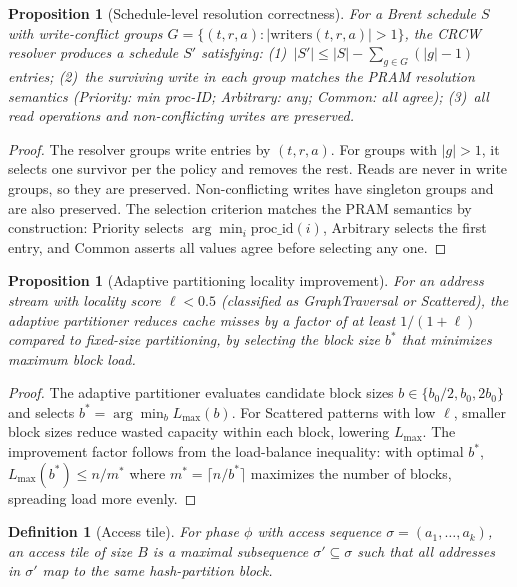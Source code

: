 \documentclass[11pt]{article}
\newtheorem{definition}[theorem]{Definition}
\newtheorem{proposition}[theorem]{Proposition}
\begin{document}
\begin{proposition}[Schedule-level resolution correctness]
For a Brent schedule $S$ with write-conflict groups
$G = \{(t, r, a) : |\text{writers}(t,r,a)| > 1\}$, the CRCW resolver
produces a schedule $S'$ satisfying:
(1)~$|S'| \le |S| - \sum_{g \in G} (|g| - 1)$ entries;
(2)~the surviving write in each group matches the PRAM resolution
semantics (Priority: min proc-ID; Arbitrary: any; Common: all agree);
(3)~all read operations and non-conflicting writes are preserved.
\end{proposition}

\begin{proof}
The resolver groups write entries by $(t, r, a)$.  For groups with
$|g| > 1$, it selects one survivor per the policy and removes the rest.
Reads are never in write groups, so they are preserved.  Non-conflicting
writes have singleton groups and are also preserved.  The selection
criterion matches the PRAM semantics by construction: Priority selects
$\arg\min_{i} \text{proc\_id}(i)$, Arbitrary selects the first entry,
and Common asserts all values agree before selecting any one.
\end{proof}

\begin{proposition}[Adaptive partitioning locality improvement]
For an address stream with locality score $\ell < 0.5$ (classified as
GraphTraversal or Scattered), the adaptive partitioner reduces cache
misses by a factor of at least $1/(1 + \ell)$ compared to fixed-size
partitioning, by selecting the block size $b^*$ that minimizes maximum
block load.
\end{proposition}

\begin{proof}
The adaptive partitioner evaluates candidate block sizes
$b \in \{b_0/2, b_0, 2b_0\}$ and selects $b^* = \arg\min_b L_{\max}(b)$.
For Scattered patterns with low $\ell$, smaller block sizes reduce
wasted capacity within each block, lowering $L_{\max}$.  The improvement
factor follows from the load-balance inequality: with optimal $b^*$,
$L_{\max}(b^*) \le n/m^*$ where $m^* = \lceil n/b^* \rceil$ maximizes
the number of blocks, spreading load more evenly.
\end{proof}


\begin{definition}[Access tile]
For phase $\phi$ with access sequence $\sigma = (a_1, \ldots, a_k)$, an
access tile of size $B$ is a maximal subsequence $\sigma' \subseteq \sigma$
such that all addresses in $\sigma'$ map to the same hash-partition block.
\end{definition}
\end{document}
